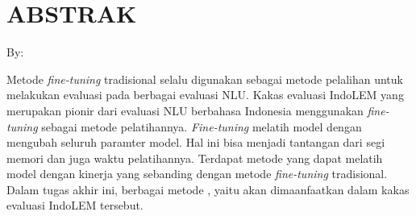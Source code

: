 \clearpage
\chapter*{ABSTRAK}

\begin{center}
    \center
    \begin{singlespace}
        \large\bfseries\MakeUppercase{\thetitle}
    
        \normalfont\normalsize
        By:
    
        \bfseries \theauthor
    \end{singlespace}
\end{center} 

\begin{singlespace}
    Metode \textit{fine-tuning} tradisional selalu digunakan sebagai metode pelalihan untuk melakukan evaluasi pada berbagai evaluasi NLU. Kakas evaluasi IndoLEM yang merupakan pionir dari evaluasi NLU berbahasa Indonesia menggunakan \textit{fine-tuning} sebagai metode pelatihannya. \textit{Fine-tuning} melatih model dengan mengubah seluruh paramter model. Hal ini bisa menjadi tantangan dari segi memori dan juga waktu pelatihannya. Terdapat metode \PEFT yang dapat melatih model dengan kinerja yang sebanding dengan metode \textit{fine-tuning} tradisional. Dalam tugas akhir ini, berbagai metode \PEFT, yaitu \methodPEFT akan dimaanfaatkan dalam kakas evaluasi IndoLEM tersebut.
\end{singlespace}

\clearpage
